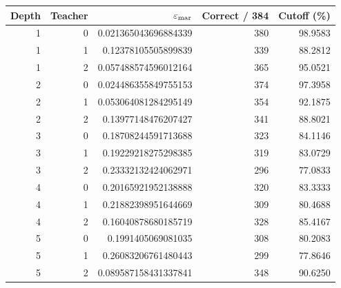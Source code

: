\begin{tabular}{rrrrr}
\toprule
Depth & Teacher & $\varepsilon_{\rm mar}$ & Correct / 384 & Cutoff (\%) \\
\midrule
1 & 0 & 0.021365043696884339 & 380 & 98.9583 \\
1 & 1 & 0.12378105505899839 & 339 & 88.2812 \\
1 & 2 & 0.057488574596012164 & 365 & 95.0521 \\
2 & 0 & 0.024486355849755153 & 374 & 97.3958 \\
2 & 1 & 0.053064081284295149 & 354 & 92.1875 \\
2 & 2 & 0.13977148476207427 & 341 & 88.8021 \\
3 & 0 & 0.18708244591713688 & 323 & 84.1146 \\
3 & 1 & 0.19229218275298385 & 319 & 83.0729 \\
3 & 2 & 0.23332132424062971 & 296 & 77.0833 \\
4 & 0 & 0.20165921952138888 & 320 & 83.3333 \\
4 & 1 & 0.21882398951644669 & 309 & 80.4688 \\
4 & 2 & 0.16040878680185719 & 328 & 85.4167 \\
5 & 0 & 0.1991405069081035 & 308 & 80.2083 \\
5 & 1 & 0.26083206761480443 & 299 & 77.8646 \\
5 & 2 & 0.089587158431337841 & 348 & 90.6250 \\
\bottomrule
\end{tabular}
